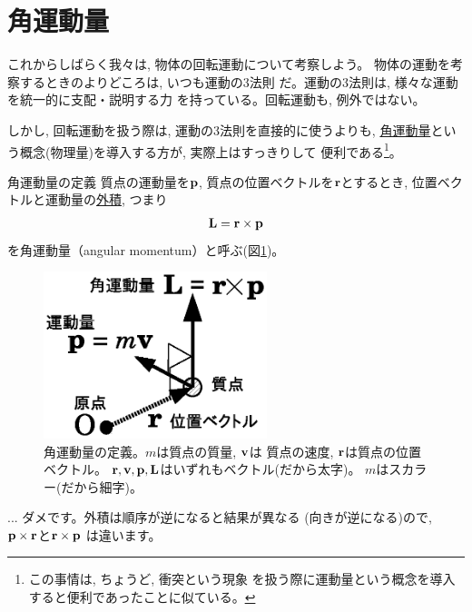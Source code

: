 \section{角運動量}

これからしばらく我々は, 物体の回転運動について考察しよう。
物体の運動を考察するときのよりどころは, いつも運動の3法則
だ。運動の3法則は, 様々な運動を統一的に支配・説明する力
を持っている。回転運動も, 例外ではない。

しかし, 回転運動を扱う際は, 運動の3法則を直接的に使うよりも, 
\underline{角運動量}という概念(物理量)を導入する方が, 実際上はすっきりして
便利である\footnote{この事情は, ちょうど, 衝突という現象
を扱う際に運動量という概念を導入すると便利であったことに似ている。}。

\begin{itembox}{角運動量の定義}
質点の運動量を${\bf p}$, 質点の位置ベクトルを${\bf r}$とするとき, 
位置ベクトルと運動量の\underline{外積}, つまり
\begin{eqnarray} 
{\bf L}={\bf r}\times{\bf p}\label{eq:def_angmom}
\end{eqnarray} 
を角運動量（angular momentum）と呼ぶ(図\ref{fig:angular_mom})。
\end{itembox}

\begin{figure}[h]
    \centering
    \includegraphics[width=6.5cm]{angular_mom.eps}
    \caption{角運動量の定義。$m$は質点の質量, ${\bf v}$は
質点の速度, ${\bf r}$は質点の位置ベクトル。
${\bf r}, {\bf v}, {\bf p}, {\bf L}$はいずれもベクトル(だから太字)。
$m$はスカラー(だから細字)。}\label{fig:angular_mom}
\end{figure}

\begin{freqmiss}{\small{} ... ダメです。外積は順序が逆になると結果が異なる
(向きが逆になる)ので, ${\bf p}\times{\bf r}$と${\bf r}\times{\bf p}$
は違います。}\end{freqmiss}

